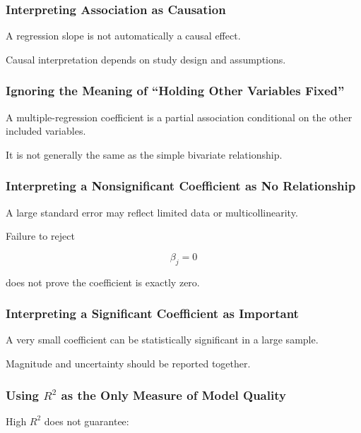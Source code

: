 \subsubsection{Interpreting Association as Causation}

A regression slope is not automatically a causal effect.

Causal interpretation depends on study design and assumptions.

\subsubsection{Ignoring the Meaning of ``Holding Other Variables Fixed''}

A multiple-regression coefficient is a partial association conditional
on the other included variables.

It is not generally the same as the simple bivariate relationship.

\subsubsection{Interpreting a Nonsignificant Coefficient as No Relationship}

A large standard error may reflect limited data or multicollinearity.

Failure to reject

\[
\beta_j=0
\]

does not prove the coefficient is exactly zero.

\subsubsection{Interpreting a Significant Coefficient as Important}

A very small coefficient can be statistically significant in a large
sample.

Magnitude and uncertainty should be reported together.

\subsubsection{Using \(R^2\) as the Only Measure of Model Quality}

High \(R^2\) does not guarantee:

